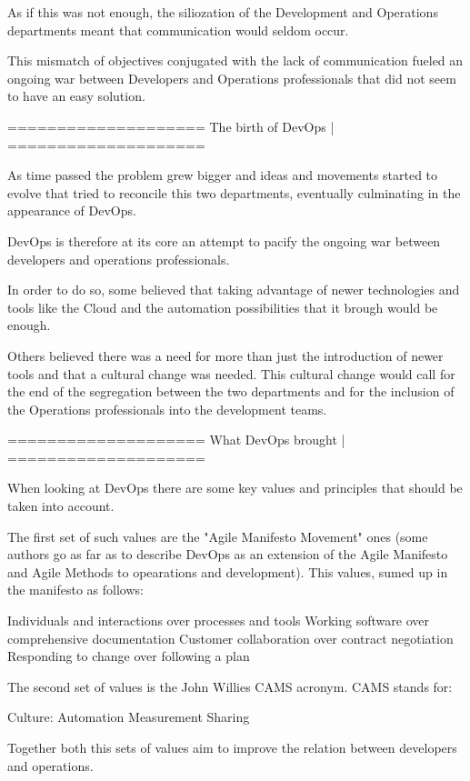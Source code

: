 As if this was not enough, the siliozation of the Development and Operations departments meant that communication would seldom occur.

This mismatch of objectives conjugated with the lack of communication fueled an ongoing war between Developers and Operations professionals that did not seem to have an easy solution.

====================
The birth of DevOps |
====================

As time passed the problem grew bigger and ideas and movements started to evolve that tried to reconcile this two departments, eventually culminating in the appearance of DevOps.

DevOps is therefore at its core an attempt to pacify the ongoing war between developers and operations professionals. 

In order to do so, some believed that taking advantage of newer technologies and tools like the Cloud and the automation possibilities that it brough would be enough. 

Others believed there was a need for more than just the introduction of newer tools and that a cultural change was needed. This cultural change would call for the end of the segregation between the two departments and for the inclusion of the Operations professionals into the development teams.



====================
What DevOps brought |
====================

When looking at DevOps there are some key values and principles that should be taken into account. 

The first set of such values are the "Agile Manifesto Movement" ones (some authors go as far as to describe DevOps as an extension of the Agile Manifesto and Agile Methods to opearations and development). This values, sumed up in the manifesto as follows:
	
	Individuals and interactions over processes and tools
	Working software over comprehensive documentation
	Customer collaboration over contract negotiation
	Responding to change over following a plan

The second set of values is the John Willies CAMS acronym. CAMS stands for:

	Culture: 
	Automation
	Measurement
	Sharing 

Together both this sets of values aim to improve the relation between developers and operations.





